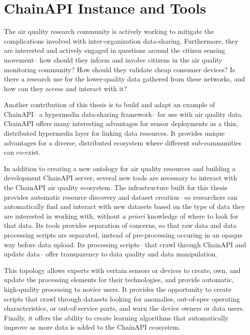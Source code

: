 \section{ChainAPI Instance and Tools}

The air quality research community is actively working to mitigate the complications involved with inter-organization data-sharing.  Furthermore, they are interested and actively engaged in questions around the citizen sensing movement-- how should they inform and involve citizens in the air quality monitoring community?  How should they validate cheap consumer devices?  Is there a research use for the lower-quality data gathered from these networks, and how can they access and interact with it? 

Another contribution of this thesis is to build and adapt an example of ChainAPI-- a hypermedia data-sharing framework-- for use with air quality data.  ChainAPI offers many interesting advantages for sensor deployments as a thin, distributed hypermedia layer for linking data resources.  It provides unique advantages for a diverse, distributed ecosystem where different sub-communities can co-exist.  

In addition to creating a new ontology for air quality resources and building a development ChainAPI server, several new tools are necessary to interact with the ChainAPI air quality ecosystem.  The infrastructure built for this thesis provides automatic resource discovery and dataset creation-- so researchers can automatically find and interact with new datasets based on the type of data they are interested in working with, without \textit{a priori} knowledge of where to look for that data.  Its tools provides separation of concerns, so that raw data and data processing scripts are separated, instead of pre-processing occuring in an opaque way before data upload.  Its processing scripts-- that crawl through ChainAPI and update data-- offer transparency to data quality and data manipulation.  

This topology allows experts with certain sensors or devices to create, own, and update the processing elements for their technologies, and provide automatic, high-quality processing to novice users.  It provides the opportunity to create scripts that crawl through datasets looking for anomalies, out-of-spec operating characteristics, or out-of-service parts, and warn the device owners or data users.  Finally, it offers the ability to create learning algorithms that automatically improve as more data is added to the ChainAPI ecosystem. 

